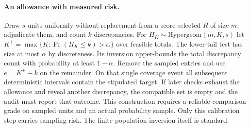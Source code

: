 \paragraph{An allowance with measured risk.}
Draw $s$ units uniformly without replacement from a score-selected $R$ of size $m$, adjudicate them, and count $k$ discrepancies. For $H_K\sim\mathrm{Hypergeom}(m,K,s)$ let $K^+=\max\{K:\Pr(H_K\leq k)>\alpha\}$ over feasible totals. The lower-tail test has size at most $\alpha$ by discreteness. Its inversion upper-bounds the total discrepancy count with probability at least $1-\alpha$. Remove the sampled entries and use $e=K^+-k$ on the remainder. On that single coverage event all subsequent deterministic intervals contain the stipulated target. If later checks exhaust the allowance and reveal another discrepancy, the compatible set is empty and the audit must report that outcome. This construction requires a reliable comparison grade on sampled units and an actual probability sample. Only this calibration step carries sampling risk. The finite-population inversion itself is standard.
